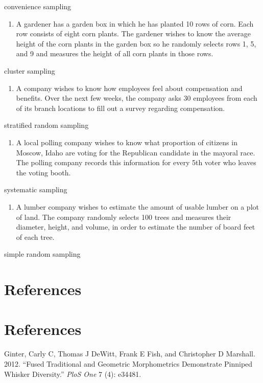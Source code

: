 \documentclass[
]{article}
\providecommand{\tightlist}{%
  \setlength{\itemsep}{0pt}\setlength{\parskip}{0pt}}
\newlength{\cslhangindent}
\newenvironment{CSLReferences}[2] %
 {\begin{list}{}{%
  \setlength{\itemindent}{0pt}
  \setlength{\leftmargin}{0pt}
  \setlength{\parsep}{0pt}
  \ifodd #1
   \setlength{\leftmargin}{\cslhangindent}
   \setlength{\itemindent}{-1\cslhangindent}
  \fi
  \setlength{\itemsep}{#2\baselineskip}}}
 {\end{list}}
\begin{document}
{convenience sampling}

\begin{enumerate}
\def\labelenumi{(\alph{enumi})}
\setcounter{enumi}{1}
\tightlist
\item
  A gardener has a garden box in which he has planted 10 rows of corn.
  Each row consists of eight corn plants. The gardener wishes to know
  the average height of the corn plants in the garden box so he randomly
  selects rows 1, 5, and 9 and measures the height of all corn plants in
  those rows.
\end{enumerate}

{cluster sampling}

\begin{enumerate}
\def\labelenumi{(\alph{enumi})}
\setcounter{enumi}{2}
\tightlist
\item
  A company wishes to know how employees feel about compensation and
  benefits. Over the next few weeks, the company asks 30 employees from
  each of its branch locations to fill out a survey regarding
  compensation.
\end{enumerate}

{stratified random sampling}

\begin{enumerate}
\def\labelenumi{(\alph{enumi})}
\setcounter{enumi}{3}
\tightlist
\item
  A local polling company wishes to know what proportion of citizens in
  Moscow, Idaho are voting for the Republican candidate in the mayoral
  race. The polling company records this information for every 5th voter
  who leaves the voting booth.
\end{enumerate}

{systematic sampling}

\begin{enumerate}
\def\labelenumi{(\alph{enumi})}
\setcounter{enumi}{4}
\tightlist
\item
  A lumber company wishes to estimate the amount of usable lumber on a
  plot of land. The company randomly selects 100 trees and measures
  their diameter, height, and volume, in order to estimate the number of
  board feet of each tree.
\end{enumerate}

{simple random sampling}

\newpage

\section{References}\label{references}

\newpage
\section{References}

\label{refs}
\begin{CSLReferences}{1}{0}
Ginter, Carly C, Thomas J DeWitt, Frank E Fish, and Christopher D
Marshall. 2012. {``Fused Traditional and Geometric Morphometrics
Demonstrate Pinniped Whisker Diversity.''} \emph{PloS One} 7 (4):
e34481.

\end{CSLReferences}
\end{document}
